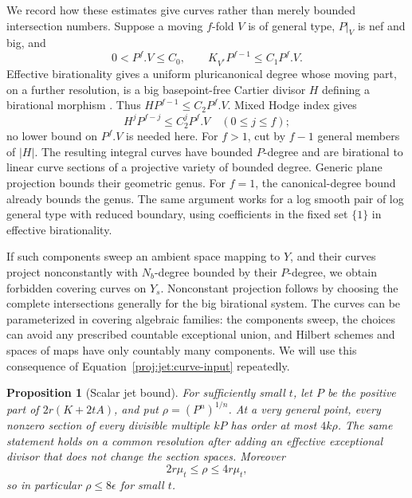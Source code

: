 \documentclass[11pt,letterpaper]{article}
\newtheorem{proposition}[theorem]{Proposition}
\theoremstyle{definition}
\theoremstyle{remark}
\begin{document}
We record how these estimates give curves rather than merely
bounded intersection numbers.  Suppose a moving \(f\)-fold \(V\)
is of general type, \(P|_V\) is nef and big, and
\begin{equation}\label{proj:jet:curve-input}
 0<P^f.V\le C_0,\qquad
 K_{V^*}P^{f-1}\le C_1P^f.V.
\end{equation}
Effective birationality gives a uniform pluricanonical degree whose
moving part, on a further resolution, is a big basepoint-free
Cartier divisor \(H\) defining a birational morphism
\cite[Theorem~4.0.1]{Proj-HMX2018}.  Thus
\(HP^{f-1}\le C_2P^f.V\).  Mixed Hodge index gives
\[
 H^jP^{f-j}\le C_2^jP^f.V\quad(0\le j\le f);
\]
no lower bound on \(P^f.V\) is needed here.  For \(f>1\), cut by
\(f-1\) general members of \(|H|\).  The resulting integral curves
have bounded \(P\)-degree and are birational to linear curve
sections of a projective variety of bounded degree.  Generic plane
projection bounds their geometric genus.  For \(f=1\), the
canonical-degree bound already bounds the genus.
The same argument works for a log smooth pair of log general type
with reduced boundary, using coefficients in the fixed set
\(\{1\}\) in effective birationality.

If such components sweep an ambient space mapping to \(Y\), and
their curves project nonconstantly with \(N_b\)-degree bounded by
their \(P\)-degree, we obtain forbidden covering curves on \(Y_s\).
Nonconstant projection follows by choosing the complete intersections
generally for the big birational system.  The curves can be
parameterized in covering algebraic families: the components sweep,
the choices can avoid any prescribed countable exceptional union,
and Hilbert schemes and spaces of maps have only countably many
components.  We will use this consequence of
Equation~\eqref{proj:jet:curve-input} repeatedly.

\begin{proposition}[Scalar jet bound]\label{proj:prop:scalar-jets}
For sufficiently small \(t\), let \(P\) be the positive part of
\(2r(K+2tA)\), and put \(\rho=(P^n)^{1/n}\).
At a very general point, every nonzero section of every divisible
multiple \(kP\) has order at most \(4k\rho\).
The same statement holds on a common resolution after adding an
effective exceptional divisor that does not change the section
spaces.  Moreover
\[
 2r\mu_t\le\rho\le4r\mu_t,
\]
so in particular \(\rho\le8\epsilon\) for small \(t\).
\end{proposition}
\end{document}
